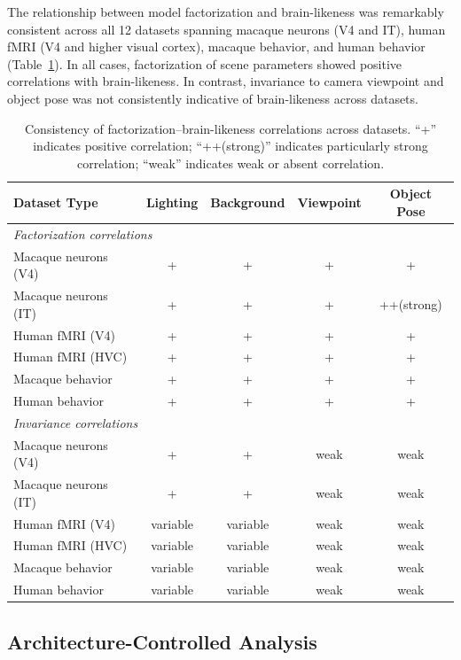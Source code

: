 \documentclass[11pt]{article}
\begin{document}
The relationship between model factorization and brain-likeness was remarkably consistent across all 12 datasets spanning macaque neurons (V4 and IT), human fMRI (V4 and higher visual cortex), macaque behavior, and human behavior (Table~\ref{tab:crossdataset}). In all cases, factorization of scene parameters showed positive correlations with brain-likeness. In contrast, invariance to camera viewpoint and object pose was not consistently indicative of brain-likeness across datasets.

\begin{table}[htbp]
\centering
\caption{Consistency of factorization--brain-likeness correlations across datasets. ``+'' indicates positive correlation; ``++(strong)'' indicates particularly strong correlation; ``weak'' indicates weak or absent correlation.}
\label{tab:crossdataset}
\begin{tabular}{lcccc}
\toprule
Dataset Type & Lighting & Background & Viewpoint & Object Pose \\
\midrule
\multicolumn{5}{l}{\textit{Factorization correlations}} \\
Macaque neurons (V4) & + & + & + & + \\
Macaque neurons (IT) & + & + & + & ++(strong) \\
Human fMRI (V4) & + & + & + & + \\
Human fMRI (HVC) & + & + & + & + \\
Macaque behavior & + & + & + & + \\
Human behavior & + & + & + & + \\
\midrule
\multicolumn{5}{l}{\textit{Invariance correlations}} \\
Macaque neurons (V4) & + & + & weak & weak \\
Macaque neurons (IT) & + & + & weak & weak \\
Human fMRI (V4) & variable & variable & weak & weak \\
Human fMRI (HVC) & variable & variable & weak & weak \\
Macaque behavior & variable & variable & weak & weak \\
Human behavior & variable & variable & weak & weak \\
\bottomrule
\end{tabular}
\end{table}

\subsection{Architecture-Controlled Analysis}
\end{document}
